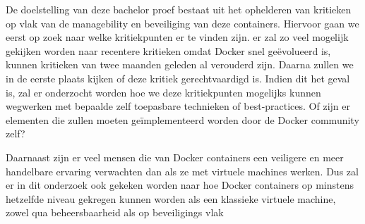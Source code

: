 De doelstelling van deze bachelor proef bestaat uit het ophelderen van kritieken op vlak van de managebility en beveiliging van deze containers. Hiervoor gaan we eerst op zoek naar welke kritiekpunten er te vinden zijn. er zal zo veel mogelijk gekijken worden naar recentere kritieken omdat Docker snel geëvolueerd is, kunnen kritieken van twee maanden geleden al verouderd zijn. Daarna zullen we in de eerste plaats kijken of deze kritiek gerechtvaardigd is. Indien dit het geval is, zal er onderzocht worden hoe we deze kritiekpunten mogelijks kunnen wegwerken met bepaalde zelf toepasbare technieken of best-practices. Of zijn er elementen die zullen moeten geïmplementeerd worden door de Docker community zelf?

Daarnaast zijn er veel mensen die van Docker containers een veiligere en meer handelbare ervaring verwachten dan als ze met virtuele machines werken. Dus zal er in dit onderzoek ook gekeken worden naar hoe Docker containers op minstens hetzelfde niveau gekregen kunnen worden als een klassieke virtuele machine, zowel qua beheersbaarheid als op beveiligings vlak

